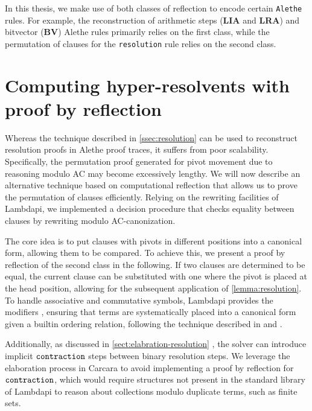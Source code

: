 In this thesis, we make use of both classes of reflection to encode certain \texttt{Alethe} rules. For example, the reconstruction of arithmetic steps (\textbf{LIA} and \textbf{LRA}) and bitvector (\textbf{BV}) Alethe rules primarily relies on the first class,
while the permutation of clauses for the \texttt{resolution} rule relies on the second class.

\section{Computing hyper-resolvents with proof by reflection}
\label{ssec:refl-reso}


Whereas the technique described in \cref{ssec:resolution} can be used to reconstruct resolution proofs in Alethe proof traces, it suffers from poor scalability.
Specifically, the permutation proof generated for pivot movement due to reasoning modulo AC may become excessively lengthy. We will now describe an alternative technique based on computational reflection that allows us to prove the permutation of clauses efficiently.
Relying on the rewriting facilities of Lambdapi, we implemented a decision procedure that checks equality between clauses by rewriting modulo AC-canonization.

The core idea is to put clauses with pivots in different positions into a canonical form, allowing them to be compared. To achieve this, we present a proof by reflection of the second class in the following.
If two clauses are determined to be equal, the current clause can be substituted with one where the pivot is placed at the head position, allowing for the subsequent application of \cref{lemma:resolution}.
To handle associative and commutative symbols, Lambdapi provides the modifiers  ,
ensuring that terms are systematically placed into a canonical form given a builtin ordering relation, following the technique described in \cite{ACorigin} and \cite[\S 5]{univAC}.

Additionally, as discussed in \cref{sect:elabration-resolution} , the solver can introduce implicit $\tt{contraction}$ steps between binary resolution steps.
We leverage the elaboration process in Carcara to avoid implementing a proof by reflection for $\tt{contraction}$, which would require structures not present in the standard library of Lambdapi to reason about collections modulo duplicate terms, such as finite sets.

